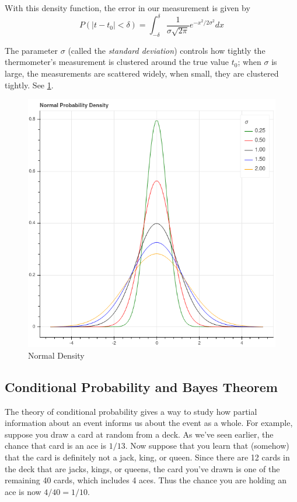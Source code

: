 \documentclass[
]{article}
\begin{document}
With this density function, the error in our measurement is given by
\begin{equation}
P(|t-t_0|<\delta)=\int_{-\delta}^{\delta} \frac{1}{\sigma\sqrt{2\pi}}e^{-x^2/2\sigma^2} dx
\label{eq:normal}\end{equation}

The parameter \(\sigma\) (called the \emph{standard deviation}) controls
how tightly the thermometer's measurement is clustered around the true
value \(t_0\); when \(\sigma\) is large, the measurements are scattered
widely, when small, they are clustered tightly. See \cref{fig:density}.

\begin{figure}
\hypertarget{fig:density}{%
\centering
\includegraphics{../img/density.png}
\caption{Normal Density}\label{fig:density}
}
\end{figure}

\hypertarget{conditional-probability-and-bayes-theorem}{%
\subsection{Conditional Probability and Bayes
Theorem}\label{conditional-probability-and-bayes-theorem}}

The theory of conditional probability gives a way to study how partial
information about an event informs us about the event as a whole. For
example, suppose you draw a card at random from a deck. As we've seen
earlier, the chance that card is an ace is \(1/13\). Now suppose that
you learn that (somehow) that the card is definitely not a jack, king,
or queen. Since there are 12 cards in the deck that are jacks, kings, or
queens, the card you've drawn is one of the remaining 40 cards, which
includes 4 aces. Thus the chance you are holding an ace is now
\(4/40=1/10\).
\end{document}
